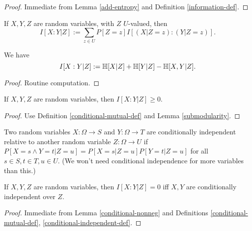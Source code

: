 \begin{proof} \leanok Immediate from Lemma \ref{add-entropy} and Definition \ref{information-def}.
\end{proof}

\begin{definition}
\label{conditional-mutual-def}
\leanok
If $X,Y,Z$ are random variables, with $Z$ $U$-valued, then
$$ I[X:Y|Z] := \sum_{z \in U} P[Z=z] I[(X|Z=z): (Y|Z=z)].$$
\end{definition}

\begin{lemma}
  \label{conditional-mutual-alt}
We have
  $$ I[X:Y|Z] := \mathbb{H}[X|Z] + \mathbb{H}[Y|Z] - \mathbb{H}[X,Y|Z].$$
\end{lemma}

\begin{proof} Routine computation.
\end{proof}

\begin{lemma}
\label{conditional-nonneg}
If $X,Y,Z$ are random variables, then $I[X:Y|Z] \ge 0$.
\end{lemma}
\begin{proof}
\leanok
Use Definition \ref{conditional-mutual-def} and Lemma \ref{submodularity}.
\end{proof}

\begin{definition}
\label{conditional-independent-def}
\leanok
  Two random variables $X: \Omega \to S$ and $Y: \Omega \to T$ are conditionally independent relative to another random variable $Z: \Omega \to U$ if $P[ X = s \wedge Y = t| Z=u] = P[X=s|Z=u] P[Y=t|Z=u]$ for all $s \in S, t \in T, u \in U$.  (We won't need conditional independence for more variables than this.)
\end{definition}

\begin{lemma}\label{conditional-vanish}
  \leanok
  If $X,Y,Z$ are random variables, then $I[X:Y|Z] = 0$ iff $X,Y$ are conditionally independent over $Z$.
\end{lemma}

\begin{proof}  Immediate from Lemma \ref{conditional-nonneg} and Definitions \ref{conditional-mutual-def}, \ref{conditional-independent-def}.
\end{proof}
